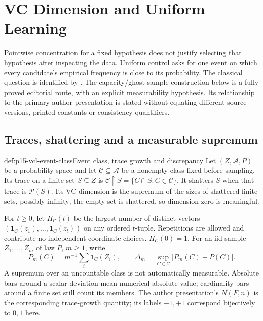 \chapter{VC Dimension and Uniform Learning}
\label{sec:p15-vc-dimension-and-uniform-learning}

Pointwise concentration for a fixed hypothesis does not justify selecting
that hypothesis after inspecting the data. Uniform control asks for one
event on which every candidate's empirical frequency is close to its
probability. The classical question is identified by
\cite{VapnikChervonenkis1971Uniform}. The capacity/ghost-sample construction
below is a fully proved editorial route, with an explicit measurability
hypothesis. Its relationship to the primary author presentation
\cite[Sections4--5.6]{LuxburgScholkopf2008Author} is stated without equating
different source versions, printed constants or consistency quantifiers.

\section{Traces, shattering and a measurable supremum}
\label{sec:p15-vcl-capacity}

\begin{hbdefinition}{def:p15-vcl-event-class}{Event class, trace growth and discrepancy}
Let \((Z,\mathcal A,P)\) be a probability space and let
\(\mathcal C\subseteq\mathcal A\) be a nonempty class fixed before
sampling. Its trace on a finite set \(S\subseteq Z\) is
\(\mathcal C\upharpoonright S=\{C\cap S:C\in\mathcal C\}\). It shatters \(S\)
when that trace is \(\mathcal P(S)\). Its VC dimension is the supremum
of the sizes of shattered finite sets, possibly infinity; the empty set
is shattered, so dimension zero is meaningful.

For \(t\geq0\), let \(\Pi_{\mathcal C}(t)\) be the largest number
of distinct vectors \((\mathbf1_C(z_1),\ldots,\mathbf1_C(z_t))\)
on any ordered \(t\)-tuple. Repetitions are allowed and contribute no
independent coordinate choices. \(\Pi_{\mathcal C}(0)=1\).
For an iid sample \(Z_1,\ldots,Z_m\) of law \(P\), \(m\geq1\),
write
\[
 P_m(C)=m^{-1}\sum_i\mathbf1_C(Z_i),\qquad
 \Delta_m=\sup_{C\in\mathcal C}|P_m(C)-P(C)|.
\]
A supremum over an uncountable class is not automatically measurable.
Absolute bars around a scalar deviation mean numerical absolute value;
cardinality bars around a finite set still count its members.
The author presentation's \(N(F,n)\) is the corresponding trace-growth
quantity; its labels \(-1,+1\) correspond bijectively to \(0,1\) here.
\end{hbdefinition}

